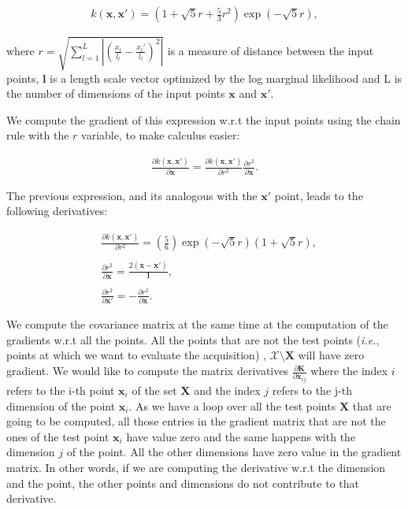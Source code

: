 \begin{align}
k(\mathbf{x}, \mathbf{x}') = (1 + \sqrt{5}r + \frac{5}{3}r^2)\exp(-\sqrt{5}r),
\end{align}

where $r = \sqrt{\sum_{l=1}^{L}|(\frac{x_l}{l_l} - \frac{x_l'}{l_l})^2|}$ is a measure of distance between the input points, $\mathbf{l}$ is a length scale vector optimized by the log marginal likelihood and L is the number of dimensions of the input points $\mathbf{x}$ and $\mathbf{x}'$.

We compute the gradient of this expression w.r.t the input points using the chain rule with the $r$ variable, to make calculus easier:

\begin{align}
\frac{\partial k(\mathbf{x}, \mathbf{x}')}{\partial \mathbf{x}} = \frac{\partial k(\mathbf{x}, \mathbf{x}')}{\partial r^2} \frac{\partial r^2}{\partial \mathbf{x}}.
\end{align}

The previous expression, and its analogous with the $\mathbf{x}'$ point, leads to the following derivatives:

\begin{align}
& \frac{\partial k(\mathbf{x}, \mathbf{x}')}{\partial r^2} = (\frac{5}{6})\exp(-\sqrt{5}r)(1+\sqrt{5}r),\\ \nonumber \\
& \frac{\partial r^2}{\partial \mathbf{x}} = \frac{2(\mathbf{x}-\mathbf{x}')}{\mathbf{l}},\\ \nonumber \\
& \frac{\partial r^2}{\partial \mathbf{x}'} = - \frac{\partial r^2}{\partial \mathbf{x}}.
\end{align}

We compute the covariance matrix at the same time at the computation of the gradients w.r.t all the points. All the points that are not the test points (\emph{i.e.}, points at which we want to evaluate the acquisition) , $\mathcal{X} \setminus \mathbf{X}$ will have zero gradient. We would like to compute the matrix derivatives $\frac{\partial \mathbf{K}}{\partial \mathbf{x}_{ij}}$ where the index $i$ refers to the i-th point $\mathbf{x}_i$ of the set $\mathbf{X}$ and the index $j$ refers to the j-th dimension of the point $\mathbf{x}_i$. As we have a loop over all the test points $\mathbf{X}$ that are going to be computed, all those entries in the gradient matrix that are not the ones of the test point $\mathbf{x}_{i}$ have value zero and the same happens with the dimension $j$ of the point. All the other dimensions have zero value in the gradient matrix. In other words, if we are computing the derivative w.r.t the dimension and the point, the other points and dimensions do not contribute to that derivative.

